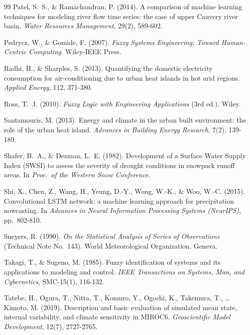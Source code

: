 \documentclass[conference]{IEEEtran}
\begin{document}
\begin{thebibliography}{99}
Patel, S.~S., \& Ramachandran, P. (2014).
\newblock A comparison of machine learning techniques for modeling river
flow time series: the case of upper Cauvery river basin.
\newblock \textit{Water Resources Management}, 29(2), 589-602.

Pedrycz, W., \& Gomide, F. (2007).
\newblock \textit{Fuzzy Systems Engineering: Toward Human-Centric
Computing}.
\newblock Wiley-IEEE Press.

Radhi, H., \& Sharples, S. (2013).
\newblock Quantifying the domestic electricity consumption for
air-conditioning due to urban heat islands in hot arid regions.
\newblock \textit{Applied Energy}, 112, 371-380.

Ross, T.~J. (2010).
\newblock \textit{Fuzzy Logic with Engineering Applications} (3rd ed.).
\newblock Wiley.

Santamouris, M. (2013).
\newblock Energy and climate in the urban built environment: the role of
the urban heat island.
\newblock \textit{Advances in Building Energy Research}, 7(2), 139-189.

Shafer, B.~A., \& Dezman, L.~E. (1982).
\newblock Development of a Surface Water Supply Index (SWSI) to assess
the severity of drought conditions in snowpack runoff areas.
\newblock In \textit{Proc.\ of the Western Snow Conference}.

Shi, X., Chen, Z., Wang, H., Yeung, D.-Y., Wong, W.-K., \& Woo, W.-C.
(2015).
\newblock Convolutional LSTM network: a machine learning approach for
precipitation nowcasting.
\newblock In \textit{Advances in Neural Information Processing Systems
(NeurIPS)}, pp.\ 802-810.

Sneyers, R. (1990).
\newblock \textit{On the Statistical Analysis of Series of Observations}
(Technical Note No.\ 143).
\newblock World Meteorological Organization, Geneva.

Takagi, T., \& Sugeno, M. (1985).
\newblock Fuzzy identification of systems and its applications to modeling
and control.
\newblock \textit{IEEE Transactions on Systems, Man, and Cybernetics},
SMC-15(1), 116-132.

Tatebe, H., Ogura, T., Nitta, T., Komuro, Y., Ogochi, K., Takemura, T.,
\ldots Kimoto, M. (2019).
\newblock Description and basic evaluation of simulated mean state,
internal variability, and climate sensitivity in MIROC6.
\newblock \textit{Geoscientific Model Development}, 12(7), 2727-2765.


\end{thebibliography}
\end{document}
